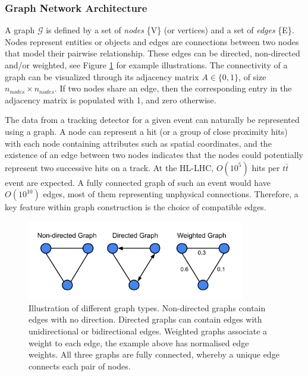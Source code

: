 \subsubsection{Graph Network Architecture}

A graph $\mathcal{G}$ is defined by a set of \textit{nodes} \{V\} (or vertices) and a set of \textit{edges} \{E\}. Nodes represent entities or objects and edges are connections between two nodes that model their pairwise relationship. These edges can be directed, non-directed and/or weighted, see Figure \ref{fig:graph-architecture-example} for example illustrations. The connectivity of a graph can be visualized through its adjacency matrix $A \in \{0, 1\}$, of size $n_{nodes} \times n_{nodes}$. If two nodes share an edge, then the corresponding entry in the adjacency matrix is populated with 1, and zero otherwise. 

The data from a tracking detector for a given event can naturally be represented using a graph. A node can represent a hit (or a group of close proximity hits) with each node containing attributes such as spatial coordinates, and the existence of an edge between two nodes indicates that the nodes could potentially represent two successive hits on a track. At the HL-LHC, $O(10^{5})$ hits per $t\bar{t}$ event are expected. A fully connected graph of such an event would have $O(10^{10})$ edges, most of them representing unphysical connections. Therefore, a key feature within graph construction is the choice of compatible edges. 

\begin{figure}[!htbp]
  \centering
  \includegraphics[width=0.85\textwidth]{images/3-track-reconstruction/Graphs.png}
  \caption{
    Illustration of different graph types. Non-directed graphs contain edges with no direction. Directed graphs can contain edges with unidirectional or bidirectional edges. Weighted graphs associate a weight to each edge, the example above has normalised edge weights. All three graphs are fully connected, whereby a unique edge connects each pair of nodes.
  }
  \label{fig:graph-architecture-example}
\end{figure}


